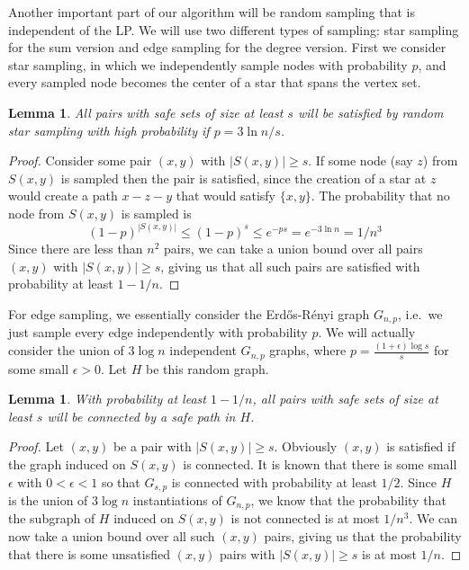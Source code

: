 \documentclass[11pt,letterpaper]{article}
\newtheorem{lemma}[theorem]{Lemma}
\theoremstyle{definition}
\begin{document}
Another important part of our algorithm will be random sampling that is independent of the LP.  We
will use two different types of sampling: star sampling for the sum version and edge sampling for the degree version.  First we
consider star sampling, in which we independently sample nodes with
probability $p$, and every sampled node becomes the center of a star that spans the vertex set.

\begin{lemma} \label{lem:star_sample}
  All pairs with safe sets of size at least $s$ will be satisfied by
  random star sampling with high probability if $p = 3\ln n / s$.
\end{lemma}
\begin{proof}
  Consider some pair $(x,y)$ with $|S(x,y)| \geq s$.  If some node
  (say $z$) from $S(x,y)$ is sampled then the pair is satisfied, since
  the creation of a star at $z$ would create a path $x-z-y$ that would
  satisfy $\{x,y\}$.  The probability that no node from $S(x,y)$ is
  sampled is
  \begin{equation*}
    (1-p)^{|S(x,y)|} \leq (1-p)^s \leq e^{-ps} = e^{-3\ln n} = 1/n^3
  \end{equation*}
  Since there are less than $n^2$ pairs, we can take a union bound
  over all pairs $(x,y)$ with $|S(x,y)| \geq s$, giving us that all
  such pairs are satisfied with probability at least $1 - 1/n$.
\end{proof}

For edge sampling, we essentially consider the Erd\H{o}s-R\'{e}nyi
graph $G_{n,p}$, i.e.\ we just sample every edge independently with
probability $p$.  We will actually consider the union of $3 \log n$
independent $G_{n,p}$ graphs, where $p = \frac{(1+\epsilon)\log s}{s}$
for some small $\epsilon > 0$.  Let $H$ be this random graph.

\begin{lemma} \label{lem:edge_sample} With probability at least
  $1-1/n$, all pairs with safe sets of size at least $s$ will be
  connected by a safe path in $H$.
\end{lemma}
\begin{proof}
  Let $(x,y)$ be a pair with $|S(x,y)| \geq s$.  Obviously $(x,y)$ is
  satisfied if the graph induced on $S(x,y)$ is connected.  It is
  known \cite{bollobas:01} that there is some small $\epsilon$ with $0
  < \epsilon < 1$ so that $G_{s,p}$ is connected with probability at
  least $1/2$.  Since $H$ is the union of $3\log n$ instantiations of
  $G_{n,p}$, we know that the probability that the subgraph of $H$
  induced on $S(x,y)$ is not connected is at most $1/n^3$.  We can now
  take a union bound over all such $(x,y)$ pairs, giving us that the
  probability that there is some unsatisfied $(x,y)$ pairs with
  $|S(x,y)| \geq s$ is at most $1/n$.
\end{proof}
\end{document}
